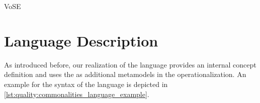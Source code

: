 \begin{copiedFrom}{VoSE}


\section*{Language Description}

As introduced before, our realization of the \commonalities language
provides an internal concept definition and uses the \conceptmetamodels as additional metamodels in the operationalization.
An example for the syntax of the \commonalities language is depicted in \autoref{lst:quality:commonalities_language_example}.


\end{copiedFrom}
